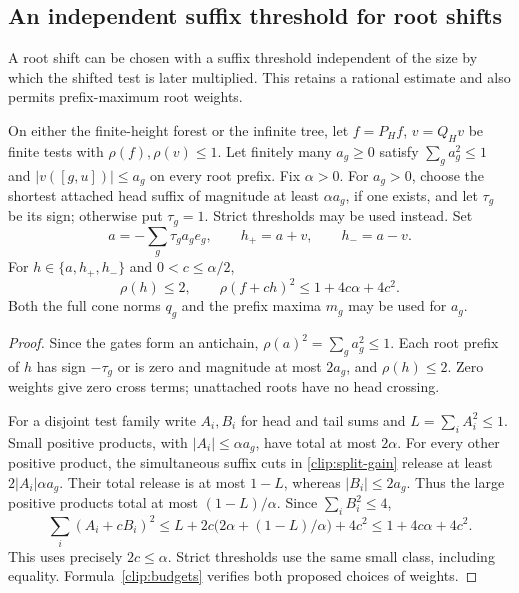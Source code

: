 \subsection{An independent suffix threshold for root shifts}
\label{dir:primal:add:root-shifts}
A root shift can be chosen with a suffix threshold independent of the
size by which the shifted test is later multiplied. This
retains a rational estimate and also permits prefix-maximum root weights.

\begin{lemma}\label{dir:primal:add:independent-threshold}
On either the finite-height forest or the infinite tree, let
\(f=P_Hf\), \(v=Q_Hv\) be finite tests with
\(\rho(f),\rho(v)\le1\). Let finitely many \(a_g\ge0\) satisfy
\(\sum_ga_g^2\le1\) and \(|v([g,u])|\le a_g\) on every root prefix.
Fix \(\alpha>0\). For \(a_g>0\), choose the shortest attached head
suffix of magnitude at least \(\alpha a_g\), if one exists, and let
\(\tau_g\) be its sign; otherwise put \(\tau_g=1\). Strict thresholds
may be used instead. Set
\[
 a=-\sum_g\tau_ga_ge_g,\qquad h_+=a+v,\qquad h_-=a-v.
\]
For \(h\in\{a,h_+,h_-\}\) and \(0<c\le\alpha/2\),
\begin{equation}\label{dir:primal:add:independent-cost}
 \rho(h)\le2,\qquad
 \rho(f+ch)^2\le1+4c\alpha+4c^2.
\end{equation}
Both the full cone norms \(q_g\) and the prefix maxima \(m_g\) may be
used for \(a_g\).
\end{lemma}
\begin{proof}
Since the gates form an antichain,
\(\rho(a)^2=\sum_ga_g^2\le1\). Each root prefix of \(h\) has sign
\(-\tau_g\) or is zero and magnitude at most \(2a_g\), and
\(\rho(h)\le2\). Zero weights give zero cross terms; unattached roots have no head crossing.

For a disjoint test family write \(A_i,B_i\) for head and tail sums and
\(L=\sum_iA_i^2\le1\). Small positive products, with
\(|A_i|\le\alpha a_g\), have total at most \(2\alpha\).
For every other positive product, the simultaneous suffix cuts in
\eqref{clip:split-gain} release at least \(2|A_i|\alpha a_g\).
Their total release is at most \(1-L\), whereas \(|B_i|\le2a_g\).
Thus the large positive products total at most \((1-L)/\alpha\).
Since \(\sum_iB_i^2\le4\),
\[
 \sum_i(A_i+cB_i)^2
 \le L+2c\bigl(2\alpha+(1-L)/\alpha\bigr)+4c^2
 \le1+4c\alpha+4c^2.
\]
This uses precisely \(2c\le\alpha\). Strict thresholds use the same
small class, including equality. Formula~\eqref{clip:budgets} verifies
both proposed choices of weights.
\end{proof}

